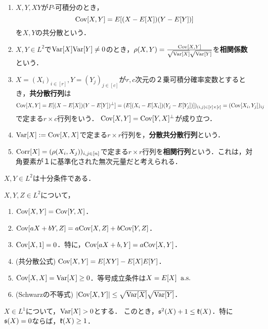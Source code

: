 \documentclass[uplatex,dvipdfmx]{jsreport}
\begin{document}
\begin{definition}\mbox{}
    \begin{enumerate}
        \item $X,Y,XY$が$P$-可積分のとき，
        \[\mathrm{Cov}[X,Y]=E[(X-E[X])(Y-E[Y])]\]
        を$X,Y$の共分散という．
        \item $X,Y\in L^2$で$\mathrm{Var}[X]\mathrm{Var}[Y]\ne 0$のとき，$\rho(X,Y)=\frac{\mathrm{Cov}[X,Y]}{\sqrt{\mathrm{Var}[X]}\sqrt{\mathrm{Var}[Y]}}$を\textbf{相関係数}という．
        \item $X=(X_i)_{i\in[r]},Y=(Y_j)_{j\in[c]}$が$r,c$次元の２乗可積分確率変数とするとき，\textbf{共分散行列}は
        \[\mathrm{Cov}[X,Y]=E[(X-E[X])(Y-E[Y])^\perp]=(E[(X_i-E[X_i])(Y_j-E[Y_j])])_{(i,j)\in[r]\times[c]}=(\mathrm{Cov}[X_i,Y_j])_{ij}\]
        で定まる$r\times c$行列をいう．
        $\mathrm{Cov}[X,Y]=\mathrm{Cov}[Y,X]^\perp$が成り立つ．
        \item $\mathrm{Var}[X]:=\mathrm{Cov}[X,X]$で定まる$r\times r$行列を，\textbf{分散共分散行列}という．
        \item $\mathrm{Corr}[X]=(\rho(X_i,X_j))_{i,j\in[n]}$で定まる$r\times r$行列を\textbf{相関行列}という．これは，対角要素が１に基準化された無次元量だと考えられる．
    \end{enumerate}
\end{definition}
\begin{remarks}
    $X,Y\in L^2$は十分条件である．
\end{remarks}

\begin{proposition}
    $X,Y,Z\in L^2$について，
    \begin{enumerate}
        \item $\mathrm{Cov}[X,Y]=\mathrm{Cov}[Y,X]$．
        \item $\mathrm{Cov}[aX+bY,Z]=a\mathrm{Cov}[X,Z]+b\mathrm{Cov}[Y,Z]$．
        \item $\mathrm{Cov}[X,1]=0$．特に，$\mathrm{Cov}[aX+b,Y]=a\mathrm{Cov}[X,Y]$．
        \item (共分散公式) $\mathrm{Cov}[X,Y]=E[XY]-E[X]E[Y]$．
        \item $\mathrm{Cov}[X,X]=\mathrm{Var}[X]\ge 0$．等号成立条件は$X=E[X]\;\;\mathrm{a.s.}$
        \item (Schwarzの不等式) $\lvert\mathrm{Cov}[X,Y]\rvert\le\sqrt{\mathrm{Var}[X]}\sqrt{\mathrm{Var}[Y]}$．
    \end{enumerate}
\end{proposition}

\begin{proposition}[Pearsonの不等式]
    $X\in L^1$について，$\mathrm{Var}[X]>0$とする．
    このとき，$\mathfrak{s}^2(X)+1\le\mathfrak{k}(X)$．特に$\mathfrak{s}(X)=0$ならば，$\mathfrak{k}(X)\ge 1$．
\end{proposition}
\end{document}
